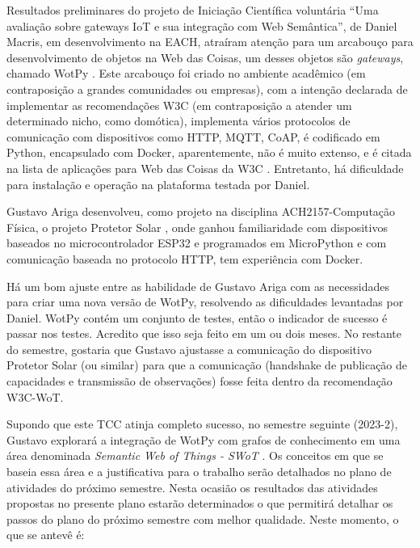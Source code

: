 

Resultados preliminares do projeto de Iniciação Científica voluntária ``Uma avaliação sobre gateways IoT e sua integração com Web Semântica'', de Daniel Macris, em desenvolvimento na EACH, atraíram atenção para um arcabouço para desenvolvimento de objetos na Web das Coisas, um desses objetos são \textit{gateways}, chamado WotPy \cite{GARCIAMANGAS2019235}. Este arcabouço foi criado no ambiente acadêmico (em contraposição a grandes comunidades ou empresas), com a intenção declarada de implementar as recomendações W3C (em contraposição a atender um determinado nicho, como domótica), implementa vários protocolos de comunicação com dispositivos como HTTP, MQTT, CoAP, é codificado em Python, encapsulado com Docker, aparentemente, não é muito extenso, e é citada na lista de aplicações para Web das Coisas da W3C \cite{WoTDevTools}. Entretanto, há dificuldade para instalação e operação na plataforma testada por Daniel.

Gustavo Ariga desenvolveu, como projeto na disciplina ACH2157-Computação Física, o projeto Protetor Solar \cite{ProtetorSolar}, onde ganhou familiaridade com dispositivos baseados no microcontrolador ESP32 e programados em MicroPython e com comunicação baseada no protocolo HTTP, tem experiência com Docker.

Há um bom ajuste entre as habilidade de Gustavo Ariga com as necessidades para criar uma nova versão de WotPy, resolvendo as dificuldades levantadas por Daniel. WotPy contém um conjunto de testes, então o indicador de sucesso é passar nos testes. Acredito que isso seja feito em um ou dois meses. No restante do semestre, gostaria que Gustavo ajustasse a comunicação do dispositivo Protetor Solar (ou similar) para que a comunicação (handshake de publicação de capacidades e transmissão de observações) fosse feita dentro da recomendação W3C-WoT. 

Supondo que este TCC atinja completo sucesso, no semestre seguinte (2023-2), Gustavo explorará a integração de WotPy com grafos de conhecimento em uma área denominada \textit{Semantic Web of Things - SWoT} \cite{Scioscia2009} \cite{Jara2014SWoT}. Os conceitos em que se baseia essa área e a justificativa para o trabalho serão detalhados no plano de atividades do próximo semestre. Nesta ocasião os resultados das atividades propostas no presente plano estarão determinados o que permitirá detalhar os passos do plano do próximo semestre com melhor qualidade. Neste momento, o que se antevê é:


